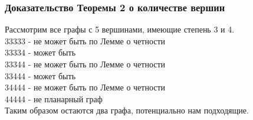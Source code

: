 \documentclass[10pt,pdf,hyperref={unicode}]{beamer}
\begin{document}
\begin{frame}
	\frametitle{Доказательство Теоремы 2 о количестве вершин}
	Рассмотрим все графы с 5 вершинами, имеющие степень 3 и 4.\\
\hfill \break	
	{\large	
		33333 - не может быть по Лемме о четности\\
		33334 - может быть\\
		33344 - не может быть по Лемме о четности\\
		33444 - может быть\\
		34444 - не может быть по Лемме о четности\\
		44444 - не планарный граф
\\	
\hfill \break	
	Таким образом остаются два графа, потенциально нам подходящие.
}
\end{frame}
\end{document}
